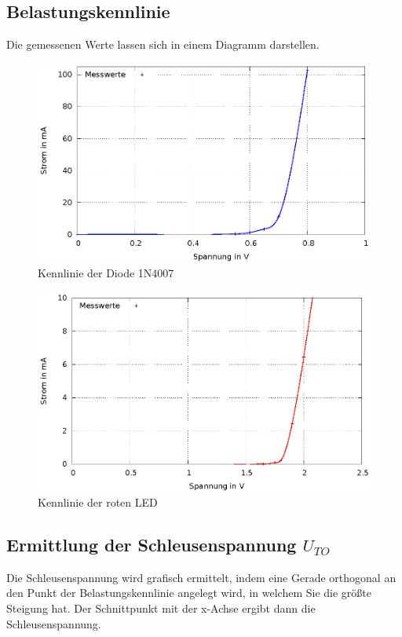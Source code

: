 \documentclass[
a4paper,     %
 headsepline, %
11pt         %
]{scrartcl}  %
\begin{document}
\subsection{Belastungskennlinie}
Die gemessenen Werte lassen sich in einem Diagramm darstellen.

\begin{figure}[hbtp]
\centering
\includegraphics[scale=1]{kennlinie_diode.eps}
\caption{Kennlinie der Diode 1N4007}
\end{figure}

\begin{figure}[hbtp]
\centering
\includegraphics[scale=1]{kennlinie_led.eps}
\caption{Kennlinie der roten LED}
\end{figure}
\newpage

\subsection{Ermittlung der Schleusenspannung $U_{TO}$}

Die Schleusenspannung wird grafisch ermittelt, indem eine Gerade orthogonal an den Punkt der Belastungskennlinie angelegt wird, in welchem Sie die größte Steigung hat.
Der Schnittpunkt mit der x-Achse ergibt dann die Schleusenspannung.
\end{document}
